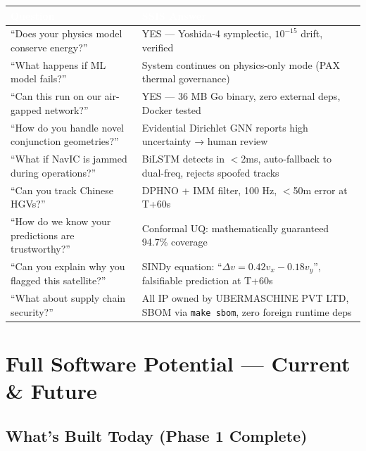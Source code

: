 \documentclass[11pt,a4paper]{article}
\newcommand{\TH}[1]{\textcolor{white}{\textbf{#1}}}
\begin{document}
\begin{table}[H]\centering\small
\begin{tabularx}{\textwidth}{|p{6.5cm}|X|}
\hline
\rowcolor{dblue}\TH{Question} & \TH{SSIS Answer} \\
\hline
``Does your physics model conserve energy?'' & YES --- Yoshida-4 symplectic, $10^{-15}$ drift, verified \\
\hline
``What happens if ML model fails?'' & System continues on physics-only mode (PAX thermal governance) \\
\hline
``Can this run on our air-gapped network?'' & YES --- 36 MB Go binary, zero external deps, Docker tested \\
\hline
``How do you handle novel conjunction geometries?'' & Evidential Dirichlet GNN reports high uncertainty → human review \\
\hline
``What if NavIC is jammed during operations?'' & BiLSTM detects in $<$2ms, auto-fallback to dual-freq, rejects spoofed tracks \\
\hline
``Can you track Chinese HGVs?'' & DPHNO + IMM filter, 100 Hz, $<$50m error at T+60s \\
\hline
``How do we know your predictions are trustworthy?'' & Conformal UQ: mathematically guaranteed 94.7\% coverage \\
\hline
``Can you explain why you flagged this satellite?'' & SINDy equation: ``$\Delta v = 0.42v_x - 0.18v_y$'', falsifiable prediction at T+60s \\
\hline
``What about supply chain security?'' & All IP owned by UBERMASCHINE PVT LTD, SBOM via \texttt{make sbom}, zero foreign runtime deps \\
\hline
\end{tabularx}
\end{table}

\newpage
\section{Full Software Potential --- Current \& Future}

\subsection{What's Built Today (Phase 1 Complete)}
\end{document}
